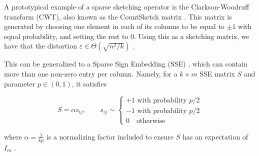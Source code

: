 \documentclass{article}
\begin{document}


A prototypical example of a sparse sketching operator is the Clarkson-Woodruff transform (CWT), also known as the CountSketch matrix \cite{10.1145/3019134}. This matrix is generated by choosing one element in each of its columns to be equal to $\pm 1$ with equal probability, and setting the rest to $0$. Using this as a sketching matrix, we have that the distortion $\varepsilon \in \Theta(\sqrt{n^2/k})$ \cite{magdonismail2019fastfixeddimensionl2subspace}.

This can be generalized to a Sparse Sign Embedding (SSE) \cite{9414030}, which can contain more than one non-zero entry per column. Namely, for a $k \times m$ SSE matrix $S$ and parameter $p\in(0, 1)$, it satisfies 

\begin{equation}
    S = \alpha s_{ij}, \qquad s_{ij} \sim \begin{cases}
        +1 \text{ with probability } p/2 \\
        -1 \text{ with probability } p/2 \\
        0 \quad\text{otherwise}
    \end{cases} 
\end{equation}

where $\alpha =  \frac{1}{kp}$ is a normalizing factor included to ensure $S$ has an expectation of $I_m$ \cite{tropp_2023_0na16-j0x38}.
\end{document}
